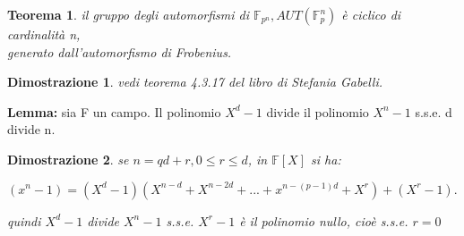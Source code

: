 \documentclass[a4paper,12pt]{article}
\theoremstyle{def}
\theoremstyle{prop}
\theoremstyle{esempio}
\theoremstyle{dimostrazione}
\newtheorem*{dimostrazione}{Dimostrazione}
\theoremstyle{teo}
\newtheorem*{teorema}{Teorema}
\theoremstyle{osservazione}
\begin{document}
\begin{teorema}
	il gruppo degli automorfismi di \(\mathbb{F}_{p^n}, AUT(\mathbb{F}_p^n)\) è ciclico di cardinalità n,\\
	generato dall'automorfismo di Frobenius.
\end{teorema}

\begin{dimostrazione}
	vedi teorema 4.3.17 del libro di Stefania Gabelli. 
\end{dimostrazione}

\textbf{Lemma:} sia F un campo. Il polinomio \(X^d - 1\) divide il polinomio \(X^n - 1\) s.s.e. d divide n.

\begin{dimostrazione}
	se \(n = qd + r, 0 \leq r \leq d\), in \(\mathbb{F}[X]\) si ha:
	\begin{center}
		\((x^n - 1) = (X^d - 1)(X^{n-d} + X^{n-2d} + ... + x^{n-(p-1)d} + X^r) + (X^r -1).\)\\
	\end{center}
	quindi \(X^d - 1\) divide \(X^n - 1\) s.s.e. \(X^r - 1\) è il polinomio nullo, cioè s.s.e. \(r = 0\)
\end{dimostrazione}
\end{document}
